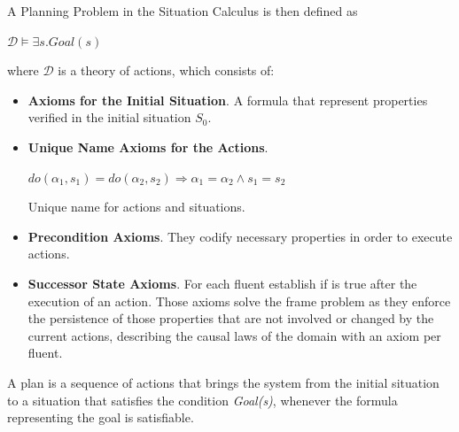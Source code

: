 \documentclass[pdftex,12pt,a4paper]{report}
\begin{document}
\noindent A Planning Problem in the Situation Calculus is then defined as 
\begin{center}
 $\mathcal{D} \vDash \exists s.Goal(s)$ 
\end{center}
\noindent where $\mathcal{D}$ is a theory of actions, which consists of: 
\begin{itemize}
\item \textbf{Axioms for the Initial Situation}. A formula that represent properties verified in the initial situation $S_0$.
\item \textbf{Unique Name Axioms for the Actions}.
\begin{center}
$do(\alpha_1 , s_1 ) = do(\alpha_2 , s_2 ) \Rightarrow \alpha_1 = \alpha_2 \wedge s_1 = s_2$
\end{center}
Unique name for actions and situations.
\item \textbf{Precondition Axioms}. They codify necessary properties in order to execute actions. 
\item \textbf{Successor State Axioms}. For each fluent establish if is true after the execution of an action. 
Those axioms solve the frame problem as they enforce the persistence of those properties that are not involved or changed by the current actions, describing the causal laws of the domain with an axiom per fluent.
\end{itemize}
\noindent A plan is a sequence of actions that brings the system from the initial situation to a situation that satisfies the condition \textit{Goal(s)}, whenever the formula representing the goal is satisfiable.

\end{document}
